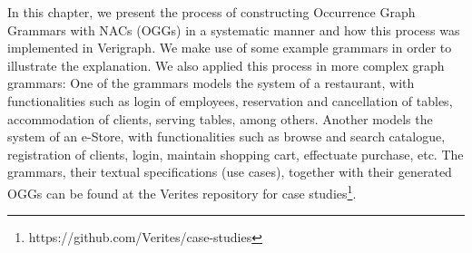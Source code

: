 In this chapter, we present the process of constructing Occurrence Graph Grammars with NACs (OGGs) in a systematic manner and how this process was implemented in Verigraph. We make use of some example grammars in order to illustrate the explanation. We also applied this process in more complex graph grammars: One of the grammars models the system of a restaurant, with functionalities such as login of employees, reservation and cancellation of tables,
accommodation of clients, serving tables, among others. Another models the system of an e-Store, with functionalities such as browse and search catalogue, registration of clients, login, maintain shopping cart, effectuate purchase, etc. The grammars, their textual specifications (use cases), together with their generated OGGs can be found at the Verites repository for case studies\footnote{https://github.com/Verites/case-studies}.



